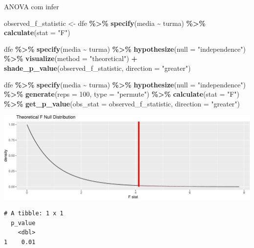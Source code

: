 \documentclass[
  9pt,
  ignorenonframetext,
  aspectratio=169]{beamer}
\newenvironment{Shaded}{\begin{snugshade}}{\end{snugshade}}
\newcommand{\DataTypeTok}[1]{\textcolor[rgb]{0.13,0.29,0.53}{#1}}
\newcommand{\DecValTok}[1]{\textcolor[rgb]{0.00,0.00,0.81}{#1}}
\newcommand{\KeywordTok}[1]{\textcolor[rgb]{0.13,0.29,0.53}{\textbf{#1}}}
\newcommand{\NormalTok}[1]{#1}
\newcommand{\OperatorTok}[1]{\textcolor[rgb]{0.81,0.36,0.00}{\textbf{#1}}}
\newcommand{\StringTok}[1]{\textcolor[rgb]{0.31,0.60,0.02}{#1}}
\begin{document}
\begin{frame}[fragile]{ANOVA com infer}
\protect\hypertarget{anova-com-infer}{}
\begin{Shaded}
\begin{Highlighting}[]
\NormalTok{observed\_f\_statistic \textless{}{-}}\StringTok{ }\NormalTok{dfe }\OperatorTok{\%\textgreater{}\%}\StringTok{ }
\StringTok{  }\KeywordTok{specify}\NormalTok{(media }\OperatorTok{\textasciitilde{}}\StringTok{ }\NormalTok{turma) }\OperatorTok{\%\textgreater{}\%}
\StringTok{  }\KeywordTok{calculate}\NormalTok{(}\DataTypeTok{stat =} \StringTok{"F"}\NormalTok{)}

\NormalTok{dfe }\OperatorTok{\%\textgreater{}\%}\StringTok{ }
\StringTok{  }\KeywordTok{specify}\NormalTok{(media }\OperatorTok{\textasciitilde{}}\StringTok{ }\NormalTok{turma) }\OperatorTok{\%\textgreater{}\%}
\StringTok{  }\KeywordTok{hypothesize}\NormalTok{(}\DataTypeTok{null =} \StringTok{"independence"}\NormalTok{) }\OperatorTok{\%\textgreater{}\%}
\StringTok{  }\KeywordTok{visualize}\NormalTok{(}\DataTypeTok{method =} \StringTok{"theoretical"}\NormalTok{) }\OperatorTok{+}\StringTok{ }
\StringTok{  }\KeywordTok{shade\_p\_value}\NormalTok{(observed\_f\_statistic,}
                \DataTypeTok{direction =} \StringTok{"greater"}\NormalTok{)}

\NormalTok{dfe }\OperatorTok{\%\textgreater{}\%}\StringTok{ }
\StringTok{  }\KeywordTok{specify}\NormalTok{(media }\OperatorTok{\textasciitilde{}}\StringTok{ }\NormalTok{turma) }\OperatorTok{\%\textgreater{}\%}
\StringTok{  }\KeywordTok{hypothesize}\NormalTok{(}\DataTypeTok{null =} \StringTok{"independence"}\NormalTok{) }\OperatorTok{\%\textgreater{}\%}
\StringTok{  }\KeywordTok{generate}\NormalTok{(}\DataTypeTok{reps =} \DecValTok{100}\NormalTok{, }\DataTypeTok{type =} \StringTok{"permute"}\NormalTok{) }\OperatorTok{\%\textgreater{}\%}
\StringTok{  }\KeywordTok{calculate}\NormalTok{(}\DataTypeTok{stat =} \StringTok{"F"}\NormalTok{) }\OperatorTok{\%\textgreater{}\%}
\StringTok{  }\KeywordTok{get\_p\_value}\NormalTok{(}\DataTypeTok{obs\_stat =}\NormalTok{ observed\_f\_statistic,}
              \DataTypeTok{direction =} \StringTok{"greater"}\NormalTok{)}
\end{Highlighting}
\end{Shaded}
\end{frame}

\begin{frame}[fragile]{}
\protect\hypertarget{section}{}
\includegraphics{aula_11_files/figure-beamer/unnamed-chunk-17-1.pdf}

\begin{verbatim}
# A tibble: 1 x 1
  p_value
    <dbl>
1    0.01
\end{verbatim}
\end{frame}
\end{document}
